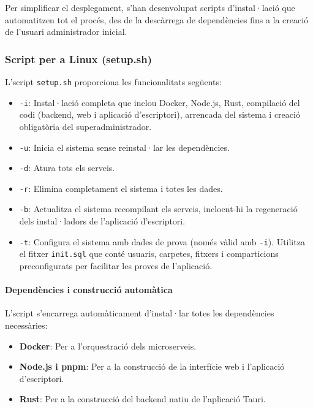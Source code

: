 Per simplificar el desplegament, s'han desenvolupat scripts d'instal·lació que automatitzen tot el procés, des de la descàrrega de dependències fins a la creació de l'usuari administrador inicial.

\subsubsection{Script per a Linux (setup.sh)}

L'script \texttt{setup.sh} proporciona les funcionalitats següents:

\begin{itemize}
  \item \texttt{-i}: Instal·lació completa que inclou Docker, Node.js, Rust, compilació del codi (backend, web i aplicació d'escriptori), arrencada del sistema i creació obligatòria del superadministrador.
  \item \texttt{-u}: Inicia el sistema sense reinstal·lar les dependències.
  \item \texttt{-d}: Atura tots els serveis.
  \item \texttt{-r}: Elimina completament el sistema i totes les dades.
  \item \texttt{-b}: Actualitza el sistema recompilant els serveis, incloent-hi la regeneració dels instal·ladors de l'aplicació d'escriptori.
  \item \texttt{-t}: Configura el sistema amb dades de prova (només vàlid amb \texttt{-i}). Utilitza el fitxer \texttt{init.sql} que conté usuaris, carpetes, fitxers i comparticions preconfigurats per facilitar les proves de l'aplicació.
\end{itemize}

\paragraph{Dependències i construcció automàtica}

L'script s'encarrega automàticament d'instal·lar totes les dependències necessàries:

\begin{itemize}
  \item \textbf{Docker}: Per a l'orquestració dels microserveis.
  \item \textbf{Node.js i pnpm}: Per a la construcció de la interfície web i l'aplicació d'escriptori.
  \item \textbf{Rust}: Per a la construcció del backend natiu de l'aplicació Tauri.
\end{itemize}

